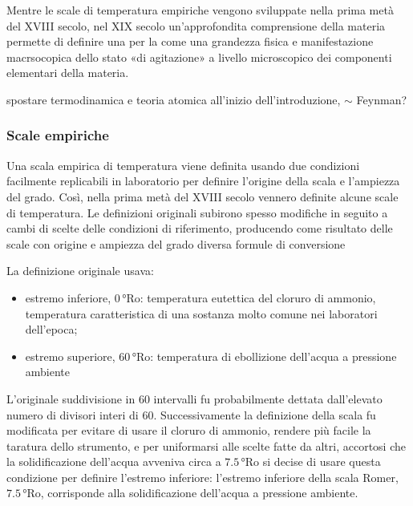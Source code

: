 \documentclass[letterpaper,10pt,italian]{jupyterBook}
\begin{document}
\sphinxAtStartPar
{} Mentre le scale di temperatura empiriche vengono sviluppate nella prima metà del XVIII secolo, nel XIX secolo un’approfondita comprensione della materia permette di definire una  per la  come una grandezza fisica e manifestazione macrsocopica dello stato «di agitazione» a livello microscopico dei componenti elementari della materia.

\sphinxAtStartPar
 spostare termodinamica e teoria atomica all’inizio dell’introduzione, \(\sim\) Feynman?


\subsubsection{Scale empiriche}
\label{\detokenize{ch/thermodynamics/foundation-experiments:scale-empiriche}}\label{\detokenize{ch/thermodynamics/foundation-experiments:physics-hs-thermodynamics-foundation-experiments-t-scales-empirical}}
\sphinxAtStartPar
Una scala empirica di temperatura viene definita usando due condizioni facilmente replicabili in laboratorio per definire l’origine della scala e l’ampiezza del grado. Così, nella prima metà del XVIII secolo vennero definite alcune scale di temperatura. Le definizioni originali subirono spesso modifiche in seguito a cambi di scelte delle condizioni di riferimento, producendo come risultato delle scale con origine e ampiezza del grado diversa formule di conversione



\sphinxAtStartPar
{} La definizione originale usava:
\begin{itemize}
\item {} 
\sphinxAtStartPar
estremo inferiore,  \(0 \, \text{°Ro}\): temperatura eutettica del cloruro di ammonio, temperatura caratteristica di una sostanza molto comune nei laboratori dell’epoca;

\item {} 
\sphinxAtStartPar
estremo superiore, \(60 \, \text{°Ro}\): temperatura di ebollizione dell’acqua a pressione ambiente

\end{itemize}

\sphinxAtStartPar
L’originale suddivisione in \(60\) intervalli fu probabilmente dettata dall’elevato numero di divisori interi di \(60\).
Successivamente la definizione della scala fu modificata per evitare di usare il cloruro di ammonio, rendere più facile la taratura dello strumento, e per uniformarsi alle scelte fatte da altri, accortosi che la solidificazione dell’acqua avveniva circa a \(7.5 \, \text{°Ro}\) si decise di usare questa condizione per definire l’estremo inferiore: l’estremo inferiore della scala Romer, \(7.5 \, \text{°Ro}\), corrisponde alla solidificazione dell’acqua a pressione ambiente.
\end{document}
